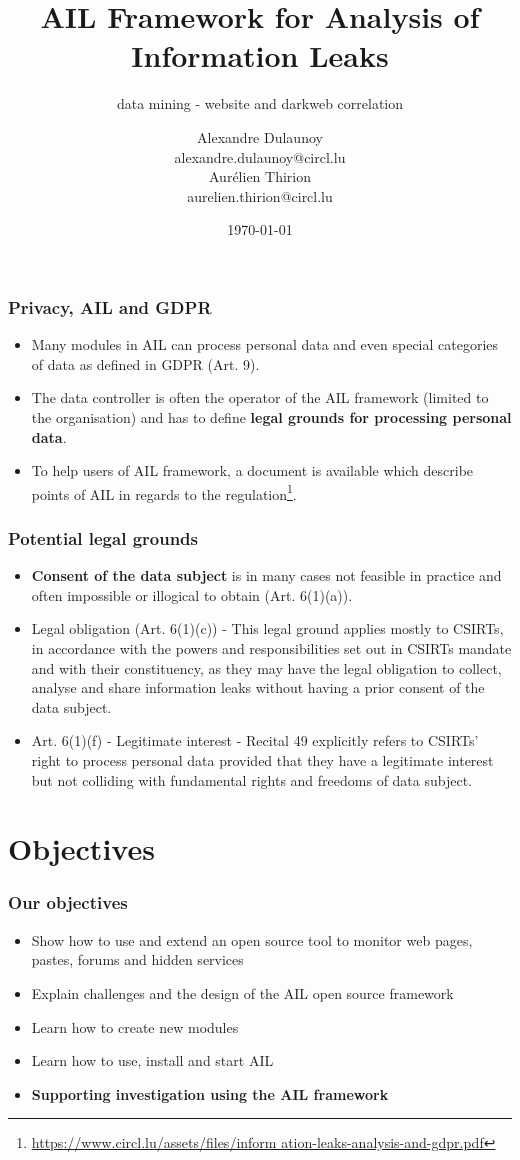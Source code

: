 \documentclass{beamer}
\author{\Large{Alexandre Dulaunoy}\\ \scriptsize{alexandre.dulaunoy@circl.lu}\\ \large{Aurélien Thirion}\\ \scriptsize{aurelien.thirion@circl.lu}\\}
\title{AIL Framework for Analysis of Information Leaks}
\subtitle{data mining - website and darkweb correlation}
\institute{info@circl.lu}
\date{\today}
\begin{document}
\begin{frame}[t,plain]
\titlepage
\end{frame}
\begin{frame}
        \frametitle{Privacy, AIL and GDPR}
        \begin{itemize}
                \item Many modules in AIL can process personal data and even special categories of data as defined in GDPR (Art. 9).
                \item The data controller is often the operator of the AIL framework (limited to the organisation) and has to define {\bf legal grounds for processing personal data}.
                \item To help users of AIL framework, a document is available which describe points of AIL in regards to the regulation\footnote{\url{https://www.circl.lu/assets/files/inform
ation-leaks-analysis-and-gdpr.pdf}}.
        \end{itemize}
\end{frame}

\begin{frame}
        \frametitle{Potential legal grounds}
        \begin{itemize}
                \item {\bf Consent of the data subject} is in many cases not feasible in practice and often impossible or illogical to obtain (Art. 6(1)(a)).
                \item Legal obligation (Art. 6(1)(c)) - This legal ground applies mostly to CSIRTs, in accordance with the powers and responsibilities set out in CSIRTs mandate and with their constituency, as they may have the legal obligation to collect, analyse and share information leaks without having a prior consent of the data subject.
				\item Art. 6(1)(f) - Legitimate interest - Recital 49 explicitly refers to CSIRTs’ right to process personal data provided that they have a legitimate interest but not colliding with fundamental rights and freedoms of data subject.
        \end{itemize}
\end{frame}




\section{Objectives}
\begin{frame}
\frametitle{Our objectives}
    \begin{itemize}
        \item Show how to use and extend an open source tool to monitor web pages, pastes, forums and hidden services
        \item Explain challenges and the design of the AIL open source framework
        \item Learn how to create new modules
        \item Learn how to use, install and start AIL
        \item {\bf Supporting investigation using the AIL framework}
    \end{itemize}
\end{frame}
\end{document}
